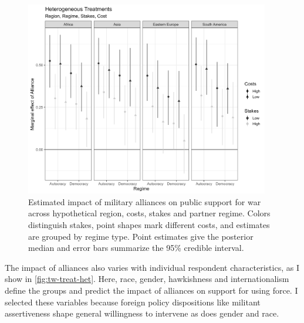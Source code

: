 \documentclass[12pt]{article}
\begin{document}
\begin{figure}[htpb]
	\centering
		\includegraphics[width=0.95\textwidth]{../figures/tw-het-treat.png}
	\caption{Estimated impact of military alliances on public support for war across hypothetical region, costs, stakes and partner regime. Colors distinguish stakes, point shapes mark different costs, and estimates are grouped by regime type. Point estimates give the posterior median and error bars summarize the 95\% credible interval.}
	\label{fig:tw-het-treat}
\end{figure}


The impact of alliances also varies with individual respondent characteristics, as I show in \autoref{fig:tw-treat-het}. 
Here, race, gender, hawkishness and internationalism define the groups and predict the impact of alliances on support for using force. 
I selected these variables because foreign policy dispositions like militant assertiveness shape general willingness to intervene \citep{Kertzeretal2014} as does gender \citep{Barnhartetal2020} and race. 
\end{document}
